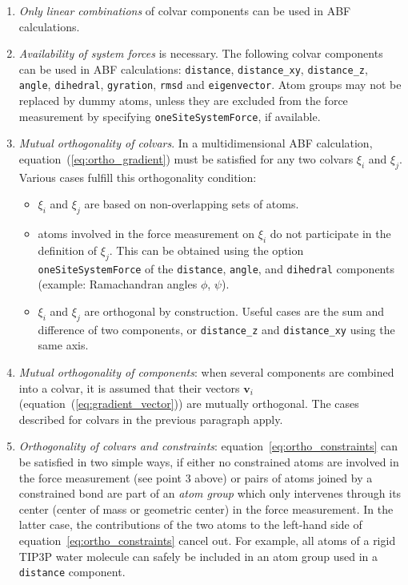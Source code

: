\begin{enumerate}
 \item \emph{Only linear combinations} of colvar components can be used in ABF calculations.
 \item \emph{Availability of system forces} is necessary. The following colvar components
can be used in ABF calculations:
\texttt{distance}, \texttt{distance\_xy}, \texttt{distance\_z}, \texttt{angle},
\texttt{dihedral}, \texttt{gyration},  \texttt{rmsd} and \texttt{eigenvector}.
Atom groups may not be replaced by dummy atoms, unless they are excluded
from the force measurement by specifying \texttt{oneSiteSystemForce}, if available.
 \item \emph{Mutual orthogonality of colvars}. In a multidimensional ABF calculation,
equation~(\ref{eq:ortho_gradient}) must be satisfied for any two colvars $\xi_{i}$ and $\xi_{j}$.
Various cases fulfill this orthogonality condition:
\begin{itemize}
 \item $\xi_{i}$ and $\xi_{j}$ are based on non-overlapping sets of atoms.
 \item atoms involved in the force measurement on $\xi_{i}$ do not participate in
the definition of $\xi_{j}$. This can be obtained using the option \texttt{oneSiteSystemForce}
of the \texttt{distance}, \texttt{angle}, and \texttt{dihedral} components
(example: Ramachandran angles $\phi$, $\psi$).
 \item $\xi_{i}$ and $\xi_{j}$ are orthogonal by construction. Useful cases are the sum and
difference of two components, or \texttt{distance\_z} and \texttt{distance\_xy} using the same axis.
\end{itemize}
 \item \emph{Mutual orthogonality of components}: when several components are combined into a colvar,
it is assumed that their vectors $\bm{v}_{i}$ (equation~(\ref{eq:gradient_vector}))
are mutually orthogonal. The cases described for colvars in the previous paragraph apply.
 \item \emph{Orthogonality of colvars and constraints}: equation~\ref{eq:ortho_constraints} can
be satisfied in two simple ways, if either no constrained atoms are involved in the force measurement
(see point 3 above) or pairs of atoms joined by a constrained bond are part of an \textit{atom group}
which only intervenes through its center (center of mass or geometric center) in the force measurement.
In the latter case, the contributions of the two atoms to the left-hand side of equation~\ref{eq:ortho_constraints}
cancel out. For example, all atoms of a rigid TIP3P water molecule can safely be included in an atom
group used in a \texttt{distance} component.
\end{enumerate}


